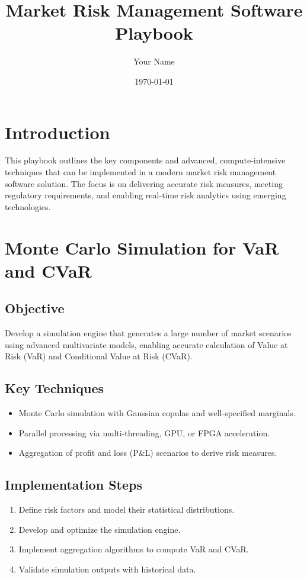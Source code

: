 \documentclass[11pt]{article}
\title{Market Risk Management Software Playbook}
\author{Your Name}
\date{\today}
\begin{document}
\maketitle
\tableofcontents
\newpage

\section{Introduction}
This playbook outlines the key components and advanced, compute-intensive techniques that can be implemented in a modern market risk management software solution. The focus is on delivering accurate risk measures, meeting regulatory requirements, and enabling real-time risk analytics using emerging technologies.

\section{Monte Carlo Simulation for VaR and CVaR}
\subsection{Objective}
Develop a simulation engine that generates a large number of market scenarios using advanced multivariate models, enabling accurate calculation of Value at Risk (VaR) and Conditional Value at Risk (CVaR).

\subsection{Key Techniques}
\begin{itemize}
    \item Monte Carlo simulation with Gaussian copulas and well-specified marginals.
    \item Parallel processing via multi-threading, GPU, or FPGA acceleration.
    \item Aggregation of profit and loss (P\&L) scenarios to derive risk measures.
\end{itemize}

\subsection{Implementation Steps}
\begin{enumerate}
    \item Define risk factors and model their statistical distributions.
    \item Develop and optimize the simulation engine.
    \item Implement aggregation algorithms to compute VaR and CVaR.
    \item Validate simulation outputs with historical data.
\end{enumerate}
\end{document}

